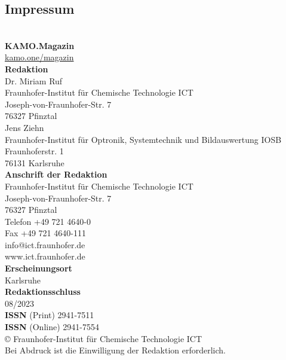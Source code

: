 %
%
%
%

\subsection*{Impressum}

\phantom{.}\\

\textbf{KAMO.Magazin}\\
\href{https://kamo.one/magazin}{kamo.one/magazin}\\[10pt]

\textbf{Redaktion}\\
Dr. Miriam Ruf\\
Fraunhofer-Institut für Chemische Technologie ICT\\
Joseph-von-Fraunhofer-Str. 7\\
76327 Pfinztal\\[10pt]

Jens Ziehn\\
Fraunhofer-Institut für Optronik, Systemtechnik und Bildauswertung IOSB\\
Fraunhoferstr. 1\\
76131 Karlsruhe\\[10pt]

\textbf{Anschrift der Redaktion}\\
Fraunhofer-Institut für Chemische Technologie ICT\\
Joseph-von-Fraunhofer-Str. 7\\
76327 Pfinztal\\[10pt]

Telefon +49 721 4640-0\\
Fax +49 721 4640-111\\
info@ict.fraunhofer.de\\
www.ict.fraunhofer.de\\[10pt]

\textbf{Erscheinungsort}\\
Karlsruhe\\[10pt]

\textbf{Redaktionsschluss}\\
08/2023\\[10pt]

\textbf{ISSN} (Print) 2941-7511 \\
\textbf{ISSN} (Online) 2941-7554 \\[10pt]

© Fraunhofer-Institut für Chemische Technologie ICT\\
Bei Abdruck ist die Einwilligung der Redaktion erforderlich.